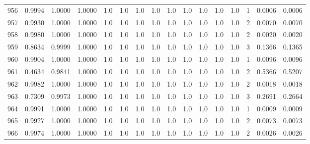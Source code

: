\begin{tabular}{lrrrrrrrrrrrrrrr}
956 &      0.9994 &  1.0000 &  1.0000 &     1.0 &     1.0 &     1.0 &     1.0 &     1.0 &     1.0 &     1.0 &      1.0 &        1.0 &      1 &                    0.0006 &                     0.0006 \\
957 &      0.9930 &  1.0000 &  1.0000 &     1.0 &     1.0 &     1.0 &     1.0 &     1.0 &     1.0 &     1.0 &      1.0 &        1.0 &      2 &                    0.0070 &                     0.0070 \\
958 &      0.9980 &  1.0000 &  1.0000 &     1.0 &     1.0 &     1.0 &     1.0 &     1.0 &     1.0 &     1.0 &      1.0 &        1.0 &      2 &                    0.0020 &                     0.0020 \\
959 &      0.8634 &  0.9999 &  1.0000 &     1.0 &     1.0 &     1.0 &     1.0 &     1.0 &     1.0 &     1.0 &      1.0 &        1.0 &      3 &                    0.1366 &                     0.1365 \\
960 &      0.9904 &  1.0000 &  1.0000 &     1.0 &     1.0 &     1.0 &     1.0 &     1.0 &     1.0 &     1.0 &      1.0 &        1.0 &      1 &                    0.0096 &                     0.0096 \\
961 &      0.4634 &  0.9841 &  1.0000 &     1.0 &     1.0 &     1.0 &     1.0 &     1.0 &     1.0 &     1.0 &      1.0 &        1.0 &      2 &                    0.5366 &                     0.5207 \\
962 &      0.9982 &  1.0000 &  1.0000 &     1.0 &     1.0 &     1.0 &     1.0 &     1.0 &     1.0 &     1.0 &      1.0 &        1.0 &      2 &                    0.0018 &                     0.0018 \\
963 &      0.7309 &  0.9973 &  1.0000 &     1.0 &     1.0 &     1.0 &     1.0 &     1.0 &     1.0 &     1.0 &      1.0 &        1.0 &      3 &                    0.2691 &                     0.2664 \\
964 &      0.9991 &  1.0000 &  1.0000 &     1.0 &     1.0 &     1.0 &     1.0 &     1.0 &     1.0 &     1.0 &      1.0 &        1.0 &      1 &                    0.0009 &                     0.0009 \\
965 &      0.9927 &  1.0000 &  1.0000 &     1.0 &     1.0 &     1.0 &     1.0 &     1.0 &     1.0 &     1.0 &      1.0 &        1.0 &      2 &                    0.0073 &                     0.0073 \\
966 &      0.9974 &  1.0000 &  1.0000 &     1.0 &     1.0 &     1.0 &     1.0 &     1.0 &     1.0 &     1.0 &      1.0 &        1.0 &      2 &                    0.0026 &                     0.0026 \\

\end{tabular}

